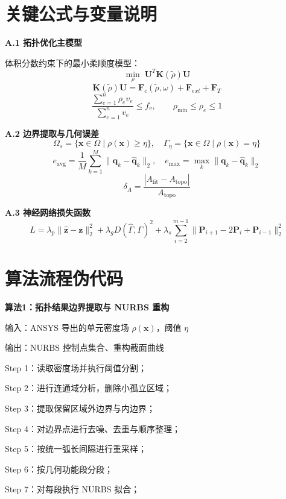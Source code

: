 \documentclass{FRB-style}
\begin{document}
\appendix

\section{关键公式与变量说明}

\noindent\textbf{A.1 拓扑优化主模型}

体积分数约束下的最小柔顺度模型：
\[
\min_{\rho} \; \mathbf{U}^{T}\mathbf{K}(\tilde{\rho})\mathbf{U}
\]
\[
\mathbf{K}(\tilde{\rho})\mathbf{U}
=
\mathbf{F}_c(\tilde{\rho},\omega)+\mathbf{F}_{ext}+\mathbf{F}_T
\]
\[
\frac{\sum_{e=1}^{n}\rho_e v_e}{\sum_{e=1}^{n}v_e}\le f_v,
\qquad
\rho_{\min}\le \rho_e \le 1
\]

\vspace{0.5em}
\noindent\textbf{A.2 边界提取与几何误差}
\[
\Omega_s=\{\mathbf{x}\in \Omega \mid \rho(\mathbf{x})\ge \eta\},
\quad
\Gamma_\eta=\{\mathbf{x}\in \Omega \mid \rho(\mathbf{x})=\eta\}
\]
\[
e_{\text{avg}}=\frac{1}{M}\sum_{k=1}^{M}\|\mathbf{q}_k-\hat{\mathbf{q}}_k\|_2,
\quad
e_{\max}=\max_k \|\mathbf{q}_k-\hat{\mathbf{q}}_k\|_2
\]
\[
\delta_A=\frac{|A_{\text{fit}}-A_{\text{topo}}|}{A_{\text{topo}}}
\]

\vspace{0.5em}
\noindent\textbf{A.3 神经网络损失函数}
\[
L=
\lambda_p \|\hat{\mathbf{z}}-\mathbf{z}\|_2^2
+
\lambda_g D(\hat{\Gamma},\Gamma)^2
+
\lambda_s \sum_{i=2}^{m-1}
\|\mathbf{P}_{i+1}-2\mathbf{P}_i+\mathbf{P}_{i-1}\|_2^2
\]

\section{算法流程伪代码}

\noindent\textbf{算法1：拓扑结果边界提取与 NURBS 重构}

输入：ANSYS 导出的单元密度场 $\rho(\mathbf{x})$，阈值 $\eta$

输出：NURBS 控制点集合、重构截面曲线

Step 1：读取密度场并执行阈值分割；

Step 2：进行连通域分析，删除小孤立区域；

Step 3：提取保留区域外边界与内边界；

Step 4：对边界点进行去噪、去重与顺序整理；

Step 5：按统一弧长间隔进行重采样；

Step 6：按几何功能段分段；

Step 7：对每段执行 NURBS 拟合；
\end{document}
